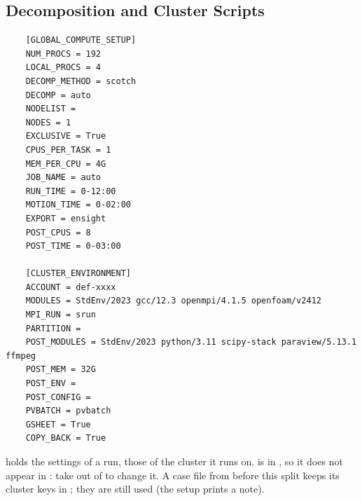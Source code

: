 \subsection{Decomposition and Cluster Scripts}
\begin{lstlisting}
    [GLOBAL_COMPUTE_SETUP]
    NUM_PROCS = 192
    LOCAL_PROCS = 4
    DECOMP_METHOD = scotch
    DECOMP = auto
    NODELIST =
    NODES = 1
    EXCLUSIVE = True
    CPUS_PER_TASK = 1
    MEM_PER_CPU = 4G
    JOB_NAME = auto
    RUN_TIME = 0-12:00
    MOTION_TIME = 0-02:00
    EXPORT = ensight
    POST_CPUS = 8
    POST_TIME = 0-03:00

    [CLUSTER_ENVIRONMENT]
    ACCOUNT = def-xxxx
    MODULES = StdEnv/2023 gcc/12.3 openmpi/4.1.5 openfoam/v2412
    MPI_RUN = srun
    PARTITION =
    POST_MODULES = StdEnv/2023 python/3.11 scipy-stack paraview/5.13.1 ffmpeg
    POST_MEM = 32G
    POST_ENV =
    POST_CONFIG =
    PVBATCH = pvbatch
    GSHEET = True
    COPY_BACK = True
\end{lstlisting}
 holds the settings of a run,  those of the cluster it runs on.  is in , so it does not appear in : take  out of  to change it. A case file from before this split keeps its cluster keys in ; they are still used (the setup prints a note).

